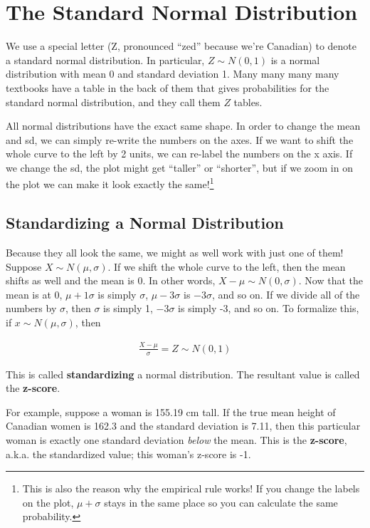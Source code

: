 \documentclass[
  letterpaper,
  DIV=11,
  numbers=noendperiod,
  oneside]{scrreprt}
\begin{document}
\hypertarget{the-standard-normal-distribution}{%
\section{The Standard Normal
Distribution}\label{the-standard-normal-distribution}}

We use a special letter (Z, pronounced ``zed'' because we're Canadian)
to denote a standard normal distribution. In particular,
\(Z\sim N(0, 1)\) is a normal distribution with mean 0 and standard
deviation 1. Many many many many textbooks have a table in the back of
them that gives probabilities for the standard normal distribution, and
they call them \(Z\) tables.

All normal distributions have the exact same shape. In order to change
the mean and sd, we can simply re-write the numbers on the axes. If we
want to shift the whole curve to the left by 2 units, we can re-label
the numbers on the x axis. If we change the sd, the plot might get
``taller'' or ``shorter'', but if we zoom in on the plot we can make it
look exactly the same!\footnote{This is also the reason why the
  empirical rule works! If you change the labels on the plot,
  \(\mu+\sigma\) stays in the same place so you can calculate the same
  probability.}

\hypertarget{standardizing-a-normal-distribution}{%
\subsection{Standardizing a Normal
Distribution}\label{standardizing-a-normal-distribution}}

Because they all look the same, we might as well work with just one of
them! Suppose \(X\sim N(\mu,\sigma)\). If we shift the whole curve to
the left, then the mean shifts as well and the mean is 0. In other
words, \(X-\mu \sim N(0,\sigma)\). Now that the mean is at 0,
\(\mu + 1\sigma\) is simply \(\sigma\), \(\mu-3\sigma\) is \(-3\sigma\),
and so on. If we divide all of the numbers by \(\sigma\), then
\(\sigma\) is simply 1, \(-3\sigma\) is simply -3, and so on. To
formalize this, if \(x\sim N(\mu,\sigma)\), then

\begin{align*}
\frac{X-\mu}{\sigma} = Z \sim N(0, 1)
\end{align*}

This is called \textbf{standardizing} a normal distribution. The
resultant value is called the \textbf{z-score}.

For example, suppose a woman is 155.19 cm tall. If the true mean height
of Canadian women is 162.3 and the standard deviation is 7.11, then this
particular woman is exactly one standard deviation \emph{below} the
mean. This is the \textbf{z-score}, a.k.a. the standardized value; this
woman's z-score is -1.
\end{document}
